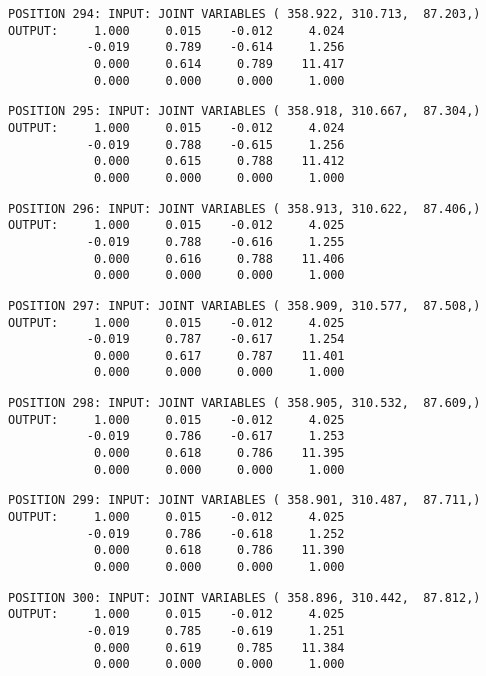 \begin{verbatim}
POSITION 294: INPUT: JOINT VARIABLES ( 358.922, 310.713,  87.203,)
OUTPUT:     1.000     0.015    -0.012     4.024
           -0.019     0.789    -0.614     1.256
            0.000     0.614     0.789    11.417
            0.000     0.000     0.000     1.000
\end{verbatim} \pagebreak[1]\begin{verbatim}
POSITION 295: INPUT: JOINT VARIABLES ( 358.918, 310.667,  87.304,)
OUTPUT:     1.000     0.015    -0.012     4.024
           -0.019     0.788    -0.615     1.256
            0.000     0.615     0.788    11.412
            0.000     0.000     0.000     1.000
\end{verbatim} \pagebreak[1]\begin{verbatim}
POSITION 296: INPUT: JOINT VARIABLES ( 358.913, 310.622,  87.406,)
OUTPUT:     1.000     0.015    -0.012     4.025
           -0.019     0.788    -0.616     1.255
            0.000     0.616     0.788    11.406
            0.000     0.000     0.000     1.000
\end{verbatim} \pagebreak[1]\begin{verbatim}
POSITION 297: INPUT: JOINT VARIABLES ( 358.909, 310.577,  87.508,)
OUTPUT:     1.000     0.015    -0.012     4.025
           -0.019     0.787    -0.617     1.254
            0.000     0.617     0.787    11.401
            0.000     0.000     0.000     1.000
\end{verbatim} \pagebreak[1]\begin{verbatim}
POSITION 298: INPUT: JOINT VARIABLES ( 358.905, 310.532,  87.609,)
OUTPUT:     1.000     0.015    -0.012     4.025
           -0.019     0.786    -0.617     1.253
            0.000     0.618     0.786    11.395
            0.000     0.000     0.000     1.000
\end{verbatim} \pagebreak[1]\begin{verbatim}
POSITION 299: INPUT: JOINT VARIABLES ( 358.901, 310.487,  87.711,)
OUTPUT:     1.000     0.015    -0.012     4.025
           -0.019     0.786    -0.618     1.252
            0.000     0.618     0.786    11.390
            0.000     0.000     0.000     1.000
\end{verbatim} \pagebreak[1]\begin{verbatim}
POSITION 300: INPUT: JOINT VARIABLES ( 358.896, 310.442,  87.812,)
OUTPUT:     1.000     0.015    -0.012     4.025
           -0.019     0.785    -0.619     1.251
            0.000     0.619     0.785    11.384
            0.000     0.000     0.000     1.000
\end{verbatim} \pagebreak[1]\begin{verbatim}

\end{verbatim}
